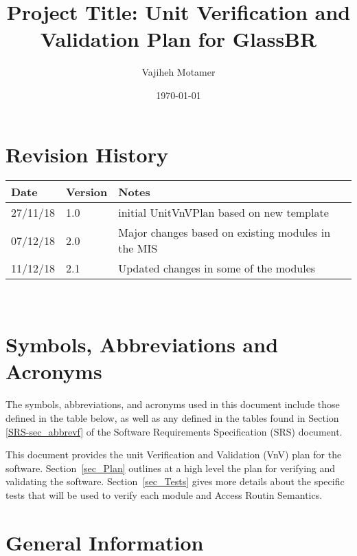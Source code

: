 \documentclass[12pt]{article}
\newcommand{\progname}{GlassBR}
\begin{document}
\title{Project Title: Unit Verification and Validation Plan for \progname{}} 
\author{Vajiheh Motamer}
\date{\today}
	
\maketitle


\section{Revision History}

\begin{tabularx}{\textwidth}{p{3cm}p{2cm}X}
\toprule {\bf Date} & {\bf Version} & {\bf Notes}\\
\midrule
27/11/18 & 1.0 & initial UnitVnVPlan based on new template\\
07/12/18 & 2.0 & Major changes based on existing modules in the MIS\\
11/12/18 & 2.1 &  Updated changes in some of the modules\\

\bottomrule
\end{tabularx}

~\newpage

\tableofcontents

\listoftables



\newpage

\section{Symbols, Abbreviations and Acronyms}
The symbols, abbreviations, and acronyms used in this document include those 
defined in the table below, as well as any defined in the tables found in 
Section \ref{SRS-sec_abbrevf} of the Software Requirements Specification (SRS) 
document.
\newline

\newpage


This document provides the unit Verification and Validation (VnV) plan for the 
software. Section~\ref{sec_Plan} outlines at a high level the 
plan for verifying and validating the software. Section~\ref{sec_Tests} gives 
more details about the specific tests that will be used to verify each module and Access Routin Semantics.

\section{General Information}
\end{document}
